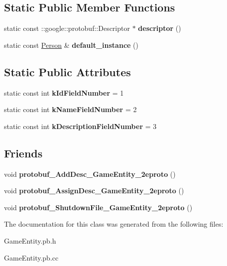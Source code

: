 \subsection*{Static Public Member Functions}
\begin{DoxyCompactItemize}
\item 
\hypertarget{class_person_a3efad12ea9aec905a380c521f40e5d07}{}static const \+::google\+::protobuf\+::\+Descriptor $\ast$ {\bfseries descriptor} ()\label{class_person_a3efad12ea9aec905a380c521f40e5d07}

\item 
\hypertarget{class_person_ab251823045c3684689b715a79e9846ed}{}static const \hyperlink{class_person}{Person} \& {\bfseries default\+\_\+instance} ()\label{class_person_ab251823045c3684689b715a79e9846ed}

\end{DoxyCompactItemize}
\subsection*{Static Public Attributes}
\begin{DoxyCompactItemize}
\item 
\hypertarget{class_person_aea5d906cfea279457689600c739f7945}{}static const int {\bfseries k\+Id\+Field\+Number} = 1\label{class_person_aea5d906cfea279457689600c739f7945}

\item 
\hypertarget{class_person_a4e7aedece3f89bb30c0253ff9a39cb09}{}static const int {\bfseries k\+Name\+Field\+Number} = 2\label{class_person_a4e7aedece3f89bb30c0253ff9a39cb09}

\item 
\hypertarget{class_person_a04ab4ce8ff2e5378aad3cf68cf31ef0f}{}static const int {\bfseries k\+Description\+Field\+Number} = 3\label{class_person_a04ab4ce8ff2e5378aad3cf68cf31ef0f}

\end{DoxyCompactItemize}
\subsection*{Friends}
\begin{DoxyCompactItemize}
\item 
\hypertarget{class_person_a4dde39854f794a3b19e2b7b55c4b6b06}{}void {\bfseries protobuf\+\_\+\+Add\+Desc\+\_\+\+Game\+Entity\+\_\+2eproto} ()\label{class_person_a4dde39854f794a3b19e2b7b55c4b6b06}

\item 
\hypertarget{class_person_af238f5cf048f1dd08b479e04ecbe1573}{}void {\bfseries protobuf\+\_\+\+Assign\+Desc\+\_\+\+Game\+Entity\+\_\+2eproto} ()\label{class_person_af238f5cf048f1dd08b479e04ecbe1573}

\item 
\hypertarget{class_person_af5ab48289049b21ebe96df027c0dddb0}{}void {\bfseries protobuf\+\_\+\+Shutdown\+File\+\_\+\+Game\+Entity\+\_\+2eproto} ()\label{class_person_af5ab48289049b21ebe96df027c0dddb0}

\end{DoxyCompactItemize}


The documentation for this class was generated from the following files\+:\begin{DoxyCompactItemize}
\item 
Game\+Entity.\+pb.\+h\item 
Game\+Entity.\+pb.\+cc\end{DoxyCompactItemize}
